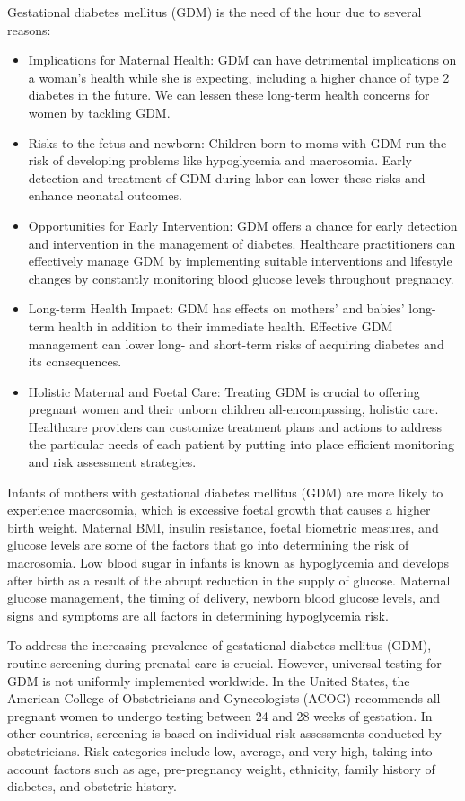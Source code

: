 \documentclass[conference,compsoc]{IEEEtran}
\begin{document}
Gestational diabetes mellitus (GDM) is the need of the hour due to several reasons:
\begin{itemize}
    \item Implications for Maternal Health: GDM can have detrimental implications on a woman's health while she is expecting, including a higher chance of type 2 diabetes in the future. We can lessen these long-term health concerns for women by tackling GDM.

   \item Risks to the fetus and newborn: Children born to moms with GDM run the risk of developing problems like hypoglycemia and macrosomia. Early detection and treatment of GDM during labor can lower these risks and enhance neonatal outcomes.
\item Opportunities for Early Intervention: GDM offers a chance for early detection and intervention in the management of diabetes. Healthcare practitioners can effectively manage GDM by implementing suitable interventions and lifestyle changes by constantly monitoring blood glucose levels throughout pregnancy.

\item Long-term Health Impact: GDM has effects on mothers' and babies' long-term health in addition to their immediate health. Effective GDM management can lower long- and short-term risks of acquiring diabetes and its consequences.

\item Holistic Maternal and Foetal Care: Treating GDM is crucial to offering pregnant women and their unborn children all-encompassing, holistic care. Healthcare providers can customize treatment plans and actions to address the particular needs of each patient by putting into place efficient monitoring and risk assessment strategies.
\end{itemize}
Infants of mothers with gestational diabetes mellitus (GDM) are more likely to experience macrosomia, which is excessive foetal growth that causes a higher birth weight. Maternal BMI, insulin resistance, foetal biometric measures, and glucose levels are some of the factors that go into determining the risk of macrosomia. Low blood sugar in infants is known as hypoglycemia and develops after birth as a result of the abrupt reduction in the supply of glucose. Maternal glucose management, the timing of delivery, newborn blood glucose levels, and signs and symptoms are all factors in determining hypoglycemia risk.

To address the increasing prevalence of gestational diabetes mellitus (GDM), routine screening during prenatal care is crucial. However, universal testing for GDM is not uniformly implemented worldwide. In the United States, the American College of Obstetricians and Gynecologists (ACOG) recommends all pregnant women to undergo testing between 24 and 28 weeks of gestation. In other countries, screening is based on individual risk assessments conducted by obstetricians. Risk categories include low, average, and very high, taking into account factors such as age, pre-pregnancy weight, ethnicity, family history of diabetes, and obstetric history.
\end{document}
